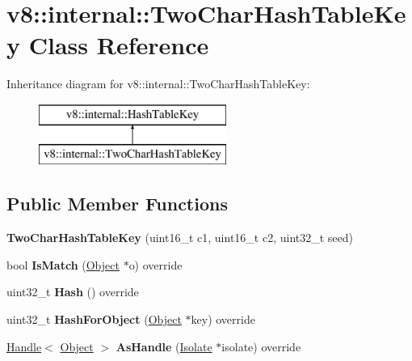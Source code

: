 \hypertarget{classv8_1_1internal_1_1_two_char_hash_table_key}{}\section{v8\+:\+:internal\+:\+:Two\+Char\+Hash\+Table\+Key Class Reference}
\label{classv8_1_1internal_1_1_two_char_hash_table_key}
Inheritance diagram for v8\+:\+:internal\+:\+:Two\+Char\+Hash\+Table\+Key\+:\begin{figure}[H]
\begin{center}
\leavevmode
\includegraphics[height=2.000000cm]{classv8_1_1internal_1_1_two_char_hash_table_key}
\end{center}
\end{figure}
\subsection*{Public Member Functions}
\begin{DoxyCompactItemize}
\item 
{\bfseries Two\+Char\+Hash\+Table\+Key} (uint16\+\_\+t c1, uint16\+\_\+t c2, uint32\+\_\+t seed)\hypertarget{classv8_1_1internal_1_1_two_char_hash_table_key_a7d1505bb428042637cd2ea5b597da779}{}\label{classv8_1_1internal_1_1_two_char_hash_table_key_a7d1505bb428042637cd2ea5b597da779}

\item 
bool {\bfseries Is\+Match} (\hyperlink{classv8_1_1internal_1_1_object}{Object} $\ast$o) override\hypertarget{classv8_1_1internal_1_1_two_char_hash_table_key_a2e24bde0b27cf0ebe7c3bb1c41d8cb51}{}\label{classv8_1_1internal_1_1_two_char_hash_table_key_a2e24bde0b27cf0ebe7c3bb1c41d8cb51}

\item 
uint32\+\_\+t {\bfseries Hash} () override\hypertarget{classv8_1_1internal_1_1_two_char_hash_table_key_af5eca450929fdb01c5fa04abd850c4bf}{}\label{classv8_1_1internal_1_1_two_char_hash_table_key_af5eca450929fdb01c5fa04abd850c4bf}

\item 
uint32\+\_\+t {\bfseries Hash\+For\+Object} (\hyperlink{classv8_1_1internal_1_1_object}{Object} $\ast$key) override\hypertarget{classv8_1_1internal_1_1_two_char_hash_table_key_a2eef7d2139c83e98469eb2d95e45eb56}{}\label{classv8_1_1internal_1_1_two_char_hash_table_key_a2eef7d2139c83e98469eb2d95e45eb56}

\item 
\hyperlink{classv8_1_1internal_1_1_handle}{Handle}$<$ \hyperlink{classv8_1_1internal_1_1_object}{Object} $>$ {\bfseries As\+Handle} (\hyperlink{classv8_1_1internal_1_1_isolate}{Isolate} $\ast$isolate) override\hypertarget{classv8_1_1internal_1_1_two_char_hash_table_key_a5b4f05cb4e664080d232f42ab09724dd}{}\label{classv8_1_1internal_1_1_two_char_hash_table_key_a5b4f05cb4e664080d232f42ab09724dd}

\end{DoxyCompactItemize}
